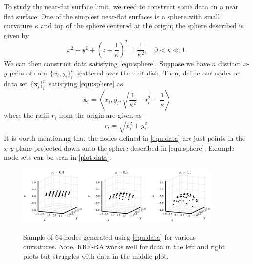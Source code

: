 \documentclass[a4paper,11pt]{article}
\newcommand{\bx}{\mathbf{x}}
\begin{document}
To study the near-flat surface limit, we need to construct some data on a near flat surface. One of the simplest near-flat surfaces is a sphere with small curvature $ \kappa $ and top of the sphere centered at the origin; the sphere described is given by
\begin{equation}
	x^2 + y^2 + \left(z + \frac{1}{\kappa}\right)^2 = \frac{1}{\kappa^2}, \quad 0 < \kappa \ll 1. \label{equ:sphere}
\end{equation}
We can then construct data satisfying \eqref{equ:sphere}. Suppose we have $ n $ distinct $ x $-$ y $ pairs of data $ \{x_i, y_i\}_i^n $ scattered over the unit disk. Then, define our nodes or data set $ \{\bx_i\}_i^n $ satisfying \eqref{equ:sphere} as
\begin{equation}
	\bx_i = \left\langle x_i, y_i, \sqrt{\frac{1}{\kappa^2} - r_i^2} - \frac{1}{\kappa} \right\rangle \label{equ:data}
\end{equation}
where the radii $ r_i $ from the origin are given as
\[
	r_i = \sqrt{x_i^2 + y_i^2}.
\]
It is worth mentioning that the nodes defined in \eqref{equ:data} are just points in the $ x $-$ y $ plane projected down onto the sphere described in \eqref{equ:sphere}. Example node sets can be seen in \autoref{plot:data}.

\begin{figure}[t]
	\centering
	\captionsetup{width = 0.9\textwidth}
	\caption{Sample of 64 nodes generated using \eqref{equ:data} for various curvatures. Note, RBF-RA works well for data in the left and right plots but struggles with data in the middle plot.}
	\includegraphics[width = 0.9\textwidth]{Images/Nodes.png}
	\label{plot:data}
\end{figure} 
\end{document}
